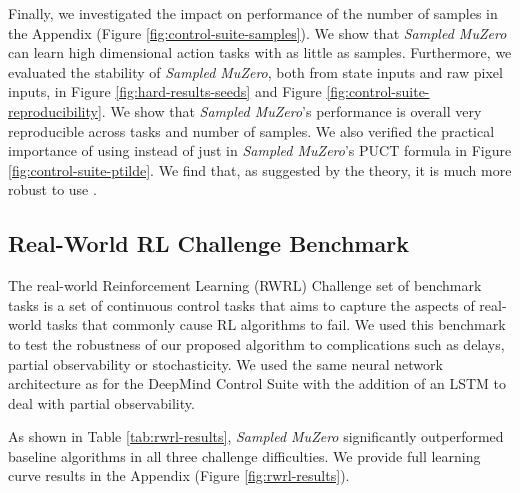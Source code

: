 \documentclass{article}
\newcommand{\smuzero}{\emph{Sampled MuZero}}
\newcommand{\dmcs}{DeepMind Control Suite }
\newcommand{\rwrl}{Real-World RL }
\begin{document}
Finally, we investigated the impact on performance of the number of samples in the Appendix (Figure \ref{fig:control-suite-samples}). We show that \smuzero{} can learn high dimensional action tasks with as little as  samples. Furthermore, we evaluated the stability of \smuzero{}, both from state inputs and raw pixel inputs, in Figure \ref{fig:hard-results-seeds} and Figure \ref{fig:control-suite-reproducibility}. We show that \smuzero{}'s performance is overall very reproducible across tasks and number of samples. We also verified the practical importance of using  instead of just  in \smuzero{}'s PUCT formula in Figure \ref{fig:control-suite-ptilde}. We find that, as suggested by the theory, it is much more robust to use .

\subsection{\rwrl Challenge Benchmark}

The real-world Reinforcement Learning (RWRL) Challenge set of benchmark tasks \cite{dulacarnold2020empirical} is a set of continuous control tasks that aims to capture the aspects of real-world tasks that commonly cause RL algorithms to fail. We used this benchmark to test the robustness of our proposed algorithm to complications such as delays, partial observability or stochasticity. We used the same neural network architecture as for the \dmcs with the addition of an LSTM \cite{lstm} to deal with partial observability.

As shown in Table \ref{tab:rwrl-results}, \smuzero{} significantly outperformed baseline algorithms in all three challenge difficulties. We provide full learning curve results in the Appendix (Figure \ref{fig:rwrl-results}).
\end{document}
